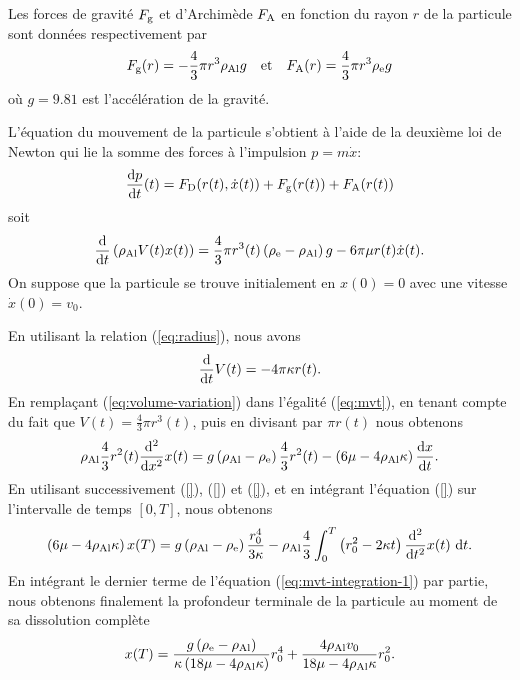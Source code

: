 Les forces de gravité $F_{\mathrm g}$ et d'Archimède $F_{\mathrm A}$
en fonction du rayon $r$ de la particule sont données respectivement
par
\begin{equation}
F_{\mathrm g}(r) = -\frac{4}{3}\pi r^3 \rho_\mathrm{Al} g
\quad\text{et}\quad
F_{\mathrm A}(r) = \frac{4}{3}\pi r^3 \rho_\mathrm{e} g
\end{equation}
où $g = 9.81$ est l'accélération de la gravité.

L'équation du mouvement de la particule s'obtient à l'aide de la
deuxième loi de Newton qui lie la somme des forces à l'impulsion $p =
m\dot x$:
\begin{equation}
\frac{\mathrm dp}{\mathrm dt}(t) = F_{\mathrm D}(r(t), \dot x(t)) + F_{\mathrm g}(r(t)) + F_{\mathrm A}(r(t))
\end{equation}
soit
\begin{equation}\label{eq:mvt}
  \frac{\mathrm d}{\mathrm dt}\left( \rho_\mathrm{Al} V(t)x(t) \right) =
  \frac{4}{3}\pi r^3(t)\left( \rho_\mathrm{e} - \rho_\mathrm{Al} \right)g -
  6\pi\mu r(t)\dot x(t).
\end{equation}
On suppose que la particule se trouve initialement en $x(0) = 0$ avec
une vitesse $\dot x(0) = v_0$.

En utilisant la relation (\ref{eq:radius}), nous avons
\begin{equation}\label{eq:volume-variation}
  \frac{\mathrm d}{\mathrm dt}V(t) = -4\pi \kappa r(t).
\end{equation}
En remplaçant (\ref{eq:volume-variation}) dans l'égalité
(\ref{eq:mvt}), en tenant compte du fait que $V(t) = \frac{4}{3}\pi
r^3(t)$, puis en divisant par $\pi r(t)$ nous obtenons
\begin{equation}
\rho_\mathrm{Al} \frac{4}{3}r^2(t)\frac{\mathrm d^2}{\mathrm dx^2}x(t)
= g\left( \rho_\mathrm{Al} - \rho_\mathrm{e} \right)\frac{4}{3}r^2(t) -
\left( 6\mu - 4\rho_\mathrm{Al}
  \kappa \right)\frac{\mathrm dx}{\mathrm dt}.
\end{equation}
En utilisant successivement (\ref{}), (\ref{}) et (\ref{}), et en
intégrant l'équation (\ref{}) sur l'intervalle de temps $[0, T]$, nous
obtenons
\begin{equation}\label{eq:mvt-integration-1}
\left( 6\mu - 4\rho_\mathrm{Al}\kappa \right)x(T)
= g\left( \rho_\mathrm{Al} -
  \rho_\mathrm{e} \right)\frac{r_0^4}{3\kappa}-\rho_\mathrm{Al}\frac{4}{3}\int_0^T\left( r_0^2
- 2\kappa t \right)\frac{\mathrm d^2}{\mathrm dt^2}x(t)\,\,\mathrm dt.
\end{equation}
En intégrant le dernier terme de l'équation
(\ref{eq:mvt-integration-1}) par partie, nous obtenons finalement la
profondeur terminale de la particule au moment de sa dissolution complète
\begin{equation}\label{eq:particle-terminal-position}
x(T) = \frac{g\left( \rho_\mathrm{e} -
    \rho_\mathrm{Al} \right)}{\kappa
  \left( 18\mu - 4\rho_\mathrm{Al}
    \kappa \right)}r_0^4 + \frac{4 \rho_\mathrm{Al}
  v_0}{18\mu - 4\rho_\mathrm{Al} \kappa} r_0^2.
\end{equation}

